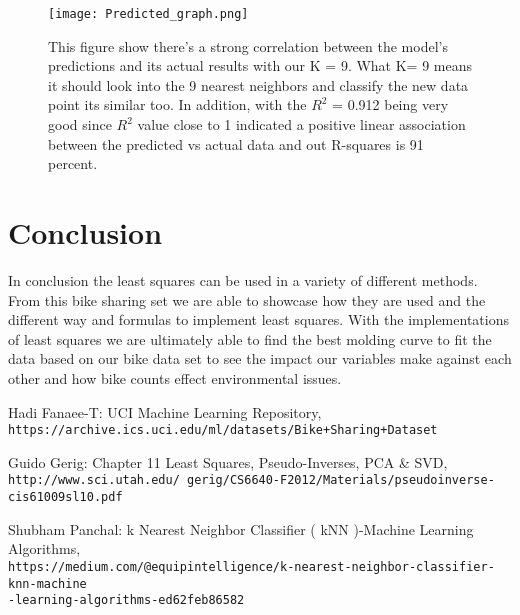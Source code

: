 \documentclass[
]{article}
\begin{document}
\begin{figure}
\centering
\texttt{[image: Predicted\_graph.png]}
\caption{This figure show there’s a strong correlation between the model’s predictions and its actual results with our K = 9. What K= 9 means it should look into the 9 nearest neighbors and classify the new data point its similar too. In addition, with the $R^2$ = 0.912 being very good since $R^2$ value close to 1 indicated a positive linear association between the predicted vs actual data and out R-squares is 91 percent.}
\end{figure}


\hypertarget{conclusion}{%
\section{Conclusion }\label{conclusion}}
In conclusion the least squares can be used in a variety of different methods. From this bike sharing set we are able to showcase how they are used and the different way and formulas to implement least squares. With the implementations of least squares we are ultimately able to find the best molding curve to fit the data based on our bike data set to see the impact our variables make against each other and how bike counts effect environmental issues. 


\begin{thebibliography}{3}
Hadi Fanaee-T: UCI Machine Learning Repository,
\\\texttt{https://archive.ics.uci.edu/ml/datasets/Bike+Sharing+Dataset}

Guido Gerig: Chapter 11 Least Squares, Pseudo-Inverses, PCA & SVD,
\\\texttt{http://www.sci.utah.edu/~gerig/CS6640-F2012/Materials/pseudoinverse-cis61009sl10.pdf}

Shubham Panchal: k Nearest Neighbor Classifier ( kNN )-Machine Learning Algorithms,
\\\texttt{https://medium.com/@equipintelligence/k-nearest-neighbor-classifier-knn-machine\\
-learning-algorithms-ed62feb86582}

\end{thebibliography}
\end{document}
